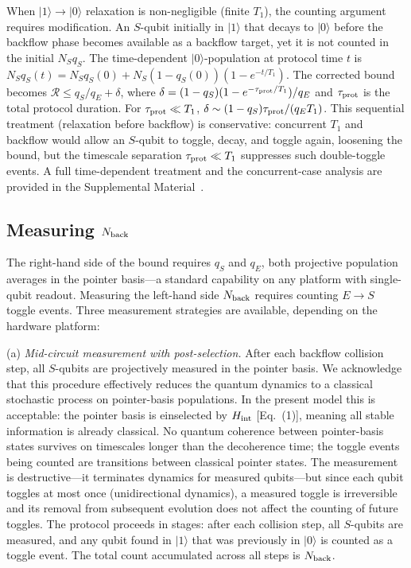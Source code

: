 \documentclass[aps,pra,twocolumn,superscriptaddress,floatfix]{revtex4-2}
\begin{document}
When $|1\rangle \to |0\rangle$ relaxation is non-negligible (finite $T_1$), the counting argument requires modification. An $S$-qubit initially in $|1\rangle$ that decays to $|0\rangle$ before the backflow phase becomes available as a backflow target, yet it is not counted in the initial $N_S q_S$. The time-dependent $|0\rangle$-population at protocol time $t$ is $N_S q_S(t) = N_S q_S(0) + N_S(1-q_S(0))(1-e^{-t/T_1})$. The corrected bound becomes $\mathcal{R} \leq q_S/q_E + \delta$, where $\delta = (1-q_S)(1-e^{-\tau_{\rm prot}/T_1})/q_E$ and $\tau_{\rm prot}$ is the total protocol duration. For $\tau_{\rm prot} \ll T_1$, $\delta \sim (1-q_S)\tau_{\rm prot}/(q_E T_1)$. This sequential treatment (relaxation before backflow) is conservative: concurrent $T_1$ and backflow would allow an $S$-qubit to toggle, decay, and toggle again, loosening the bound, but the timescale separation $\tau_{\rm prot} \ll T_1$ suppresses such double-toggle events. A full time-dependent treatment and the concurrent-case analysis are provided in the Supplemental Material~\cite{SM}.

\subsection{Measuring $N_{\rm back}$}

The right-hand side of the bound requires $q_S$ and $q_E$, both projective population averages in the pointer basis---a standard capability on any platform with single-qubit readout. Measuring the left-hand side $N_{\rm back}$ requires counting $E \to S$ toggle events. Three measurement strategies are available, depending on the hardware platform:

(a) \textit{Mid-circuit measurement with post-selection.} After each backflow collision step, all $S$-qubits are projectively measured in the pointer basis. We acknowledge that this procedure effectively reduces the quantum dynamics to a classical stochastic process on pointer-basis populations. In the present model this is acceptable: the pointer basis is einselected by $H_{\rm int}$ [Eq.~(1)], meaning all stable information is already classical. No quantum coherence between pointer-basis states survives on timescales longer than the decoherence time; the toggle events being counted are transitions between classical pointer states. The measurement is destructive---it terminates dynamics for measured qubits---but since each qubit toggles at most once (unidirectional dynamics), a measured toggle is irreversible and its removal from subsequent evolution does not affect the counting of future toggles. The protocol proceeds in stages: after each collision step, all $S$-qubits are measured, and any qubit found in $|1\rangle$ that was previously in $|0\rangle$ is counted as a toggle event. The total count accumulated across all steps is $N_{\rm back}$.
\end{document}
